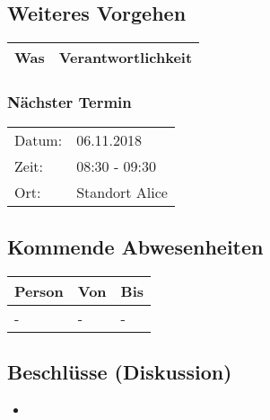 \vspace{1cm}

\subsection*{Weiteres Vorgehen}
\begin{table}[H]
    \centering
    \begin{tabular}{p{12cm} p{4cm}}
        \textbf{Was} & \textbf{Verantwortlichkeit} \\ \hline
    \end{tabular}
\end{table}

\clearpage

\subsubsection*{Nächster Termin}

\begin{tabular}{p{4cm} p{12cm}}
    Datum: & 06.11.2018 \\
    Zeit: & 08:30 - 09:30 \\
    Ort: & Standort Alice \\
\end{tabular}

\vspace{1cm}

\subsection*{Kommende Abwesenheiten}
\begin{table}[H]
    \centering
    \begin{tabular}{p{6cm} p{5cm} p{5cm}}
        \textbf{Person} & \textbf{Von} & \textbf{Bis} \\ \hline
        - & - & - \\ \hline
    \end{tabular}
\end{table}

\vspace{1cm}

\subsection*{Beschlüsse (Diskussion)}
\begin{itemize}
    \item
\end{itemize}

